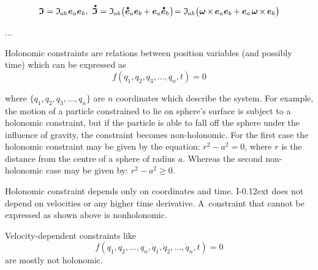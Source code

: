 \[
\inertiatensor = \inertiatensorcomponents{ab} \hspace{.1ex} \bm{e}_a \bm{e}_b
\hspace{.1ex} , \hspace{.8ex}
\mathdotabove{\inertiatensor}
= \inertiatensorcomponents{ab} \bigl( \mathdotabove{\bm{e}}_a \bm{e}_b \hspace{-0.1ex} + \bm{e}_a \mathdotabove{\bm{e}}_b \hspace{.12ex} \bigr) \hspace{-0.4ex}
= \inertiatensorcomponents{ab} \bigl( \bm{\omega} \hspace{-0.2ex} \times \hspace{-0.2ex} \bm{e}_a \bm{e}_b \hspace{-0.1ex} + \bm{e}_a \hspace{.2ex} \bm{\omega} \hspace{-0.2ex} \times \hspace{-0.2ex} \bm{e}_b \hspace{.12ex} \bigr)
\]

...


{\small\setlength{\abovedisplayskip}{2pt}\setlength{\belowdisplayskip}{2pt}

Holonomic constraints are relations between position variables (and possibly time) which can be expressed as
\[ f(q_{1}, q_{2}, q_{3}, \ldots, q_{n}, t) = 0 \]

\noindent where ${\{q_{1},q_{2},q_{3},\ldots,q_{n}\}}$ are $n$ coordinates which describe the system. For example, the motion of a particle constrained to lie on sphere’s surface is subject to a holonomic constraint, but if the particle is able to fall off the sphere under the influence of gravity, the constraint becomes non-holonomic. For the first case the holonomic constraint may be given by the equation: ${r^{2} - a^{2} = 0}$, where $r$ is the distance from the centre of a sphere of radius $a$. Whereas the second non-holonomic case may be given by: ${r^{2} - a^{2} \geq 0}$.

Holonomic constraint depends only on coordinates and time. I\kern-0.12ext does not depend on velocities or any higher time derivative. A~constraint that cannot be expressed as shown above is nonholonomic.

Velocity-dependent constraints like
\[ \displaystyle f(q_{1}, q_{2}, \ldots, q_{n}, {\dot {q}}_{1}, {\dot {q}}_{2}, \ldots, {\dot {q}}_{n}, t) = 0 \]
are mostly not holonomic.
\par}



